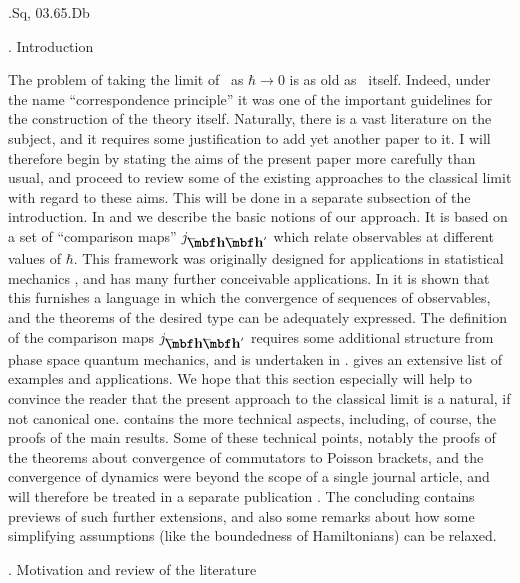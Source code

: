 \hfill{}.Sq, %
03.65.Db  %
\vfil\eject

. Introduction

The problem of taking the limit  of \QM\ as $\hbar\to0$ is as old as
\QM\ itself. Indeed, under the name ``correspondence principle'' it
was one of the important guidelines for the construction of the
theory itself. Naturally, there is a vast literature on the subject,
and it requires some justification to add yet another paper to it. I
will therefore begin by stating the aims of the present paper more
carefully than usual, and proceed to review some of the existing
approaches to the classical limit with regard to these aims. This
will be done in a separate subsection of the introduction.
In  and  we describe the basic notions of our approach.
It is based on a set of ``comparison maps'' $\jhh$ which relate
observables at different values of  $\hbar$. This framework was
originally designed for applications in statistical mechanics
\cite{KAC}, and has many further conceivable applications. In
 it is shown that this furnishes a language in which the
convergence of sequences of observables, and the theorems of the
desired type can be adequately expressed. The definition of the
comparison maps $\jhh$ requires some additional structure from phase
space quantum mechanics, and is undertaken in . 
gives an extensive list of examples and applications. We hope that
this section especially will help to convince the reader that the
present approach to the classical limit is a natural, if not
canonical one.  contains the more technical aspects, including,
of course, the proofs of the main results. Some of these technical
points, notably the proofs of the theorems about convergence of
commutators to Poisson brackets, and the convergence of dynamics
were beyond the scope of a single journal article, and will
therefore be treated in a separate publication \cite{CLD}. The
concluding  contains previews of such further extensions, and
also some remarks about how some simplifying assumptions (like the
boundedness of Hamiltonians) can be relaxed.


. Motivation and review of the literature

